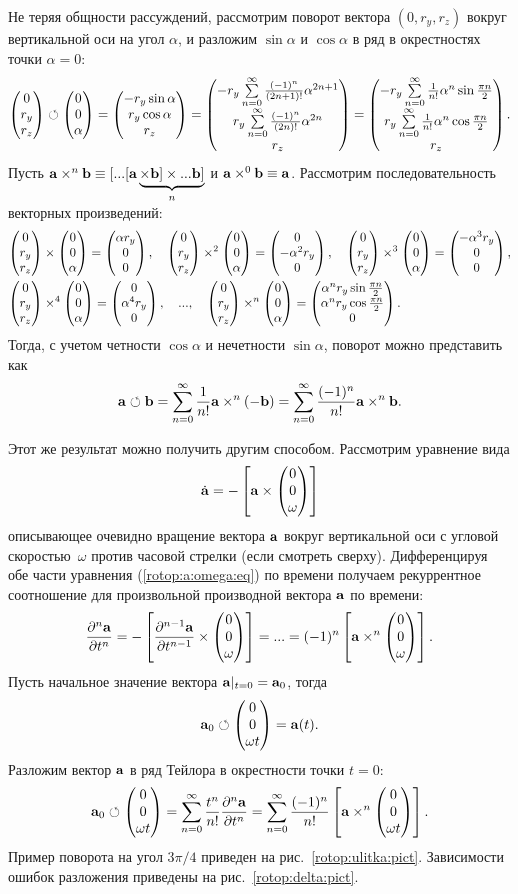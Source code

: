 Не теряя общности рассуждений, рассмотрим поворот вектора $(0,r_y,r_z)$ вокруг вертикальной оси на угол $\alpha$, 
и разложим  $\sin\alpha$ и $\cos\alpha$ в ряд в окрестностях точки $\alpha=0$:
$$
\vctr3{0}{r_y}{r_z}\rotop\vctr3{0}{0}{\alpha} = 
\vctr3{-r_y\sin\alpha}{r_y\cos\alpha}{r_z} = 
\vctr3{- r_y \sum\limits_{n=0}^\infty \frac{(-1)^n}{(2n+1)!} \alpha^{2n+1} }{
r_y\sum\limits_{n=0}^\infty \frac{(-1)^n}{(2n)!} \alpha^{2n} }{r_z} = 
\vctr3{- r_y \sum\limits_{n=0}^\infty \frac1{n!} \alpha^n \sin\frac{\pi n}2 }{
r_y\sum\limits_{n=0}^\infty \frac1{n!} \alpha^n \cos\frac{\pi n}2 }{r_z}. $$
Пусть ${\bf a}\times^n{\bf b} \equiv [...[{\bf a} \underbrace{\times {\bf b}]\times ... {\bf b}]}_n$ и ${\bf a}\times^0{\bf b} \equiv{\bf a}$. 
Рассмотрим последовательность векторных произведений:
\begin{align}
\vctr3{0}{r_y}{r_z}& \times\vctr3{0}{0}{\alpha} = \vctr3{\alpha r_y}{0}{0}, \quad 
\vctr3{0}{r_y}{r_z}\times^2\vctr3{0}{0}{\alpha} = \vctr3{0}{-\alpha^2 r_y}{0}, \quad 
\vctr3{0}{r_y}{r_z}\times^3\vctr3{0}{0}{\alpha} = \vctr3{-\alpha^3 r_y}{0}{0},  \notag\\
\vctr3{0}{r_y}{r_z}& \times^4\vctr3{0}{0}{\alpha} = \vctr3{0}{\alpha^4 r_y}{0}, \quad  ..., \quad
\vctr3{0}{r_y}{r_z}\times^n\vctr3{0}{0}{\alpha} = \vctr3{ \alpha^n r_y \sin\frac{\pi n}2}{\alpha^n r_y \cos\frac{\pi n}2}{0}.
\notag
\end{align}
Тогда, с учетом четности $\cos\alpha$ и нечетности $\sin\alpha$, поворот можно представить как
$$
{\bf a} \circlearrowleft {\bf b} = \sum\limits_{n=0}^\infty \frac1{n!}{\bf a} \times^n(-{\bf b}) = \sum\limits_{n=0}^\infty \frac{(-1)^n}{n!}{\bf a} \times^n{\bf b}.
$$


Этот же результат можно получить другим способом. Рассмотрим уравнение вида
\begin{equation}
\dot\a = -\left[ \a \times \vctr3{0}{0}{\omega} \right] \label{rotop:a:omega:eq}
\end{equation}
описывающее очевидно вращение вектора ${\bf a}$ вокруг вертикальной оси с угловой скоростью~$\omega$ против часовой стрелки (если смотреть сверху). 
Дифференцируя обе части уравнения (\ref{rotop:a:omega:eq}) по времени получаем рекуррентное соотношение для произвольной производной вектора ${\bf a}$ по времени:
$$
\frac{\partial^n\a}{\partial t^n} = -\left[ \frac{\partial^{n-1}\a}{\partial t^{n-1}} \times \vctr3{0}{0}{\omega} \right] = ... 
= (-1)^n \left[ \a \times^n \vctr3{0}{0}{\omega} \right].
$$
Пусть начальное значение вектора ${\bf a}|_{t=0}={\bf a}_0$, тогда
$$
\a_0 \rotop \vctr3{0}{0}{\omega t} = \a(t).
$$
Разложим вектор ${\bf a}$ в ряд Тейлора в окрестности точки $t=0$:
$$
\a_0 \rotop \vctr3{0}{0}{\omega t} = \sum\limits_{n=0}^\infty \frac{t^n}{n!}\frac{\partial^n\a}{\partial t^n} = 
\sum\limits_{n=0}^\infty \frac{(-1)^n}{n!} \left[ \a \times^n \vctr3{0}{0}{\omega t} \right].
$$
Пример поворота на угол $3\pi/4$ приведен на рис.~\ref{rotop:ulitka:pict}.
Зависимости ошибок разложения приведены на рис.~\ref{rotop:delta:pict}.

